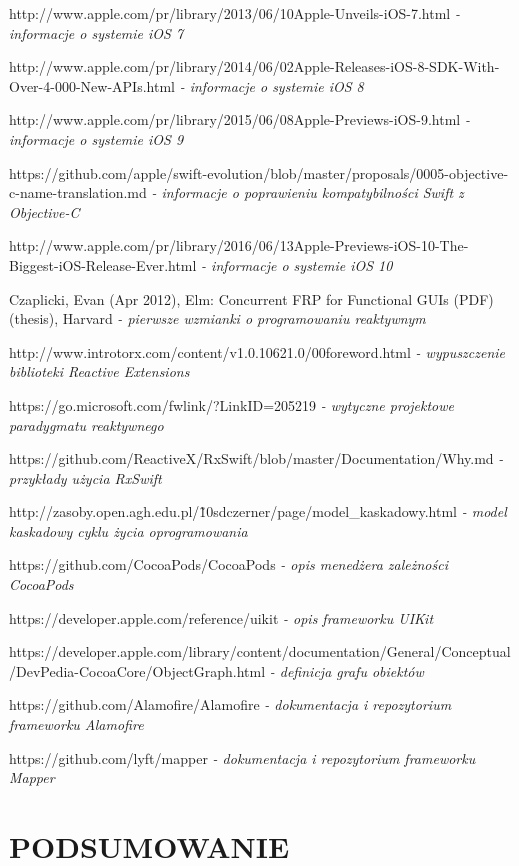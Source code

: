 \documentclass[12pt,oneside,a4paper]{report}
\begin{document}
\begin{thebibliography}{50}
http://www.apple.com/pr/library/2013/06/10Apple-Unveils-iOS-7.html
\emph{ - informacje o systemie iOS 7}

http://www.apple.com/pr/library/2014/06/02Apple-Releases-iOS-8-SDK-With-Over-4-000-New-APIs.html
\emph{ - informacje o systemie iOS 8}

http://www.apple.com/pr/library/2015/06/08Apple-Previews-iOS-9.html
\emph{ - informacje o systemie iOS 9}

https://github.com/apple/swift-evolution/blob/master/proposals/0005-objective-c-name-translation.md
\emph{ - informacje o poprawieniu kompatybilności Swift z Objective-C}

http://www.apple.com/pr/library/2016/06/13Apple-Previews-iOS-10-The-Biggest-iOS-Release-Ever.html
\emph{ - informacje o systemie iOS 10}

 Czaplicki, Evan (Apr 2012), Elm: Concurrent FRP for Functional GUIs (PDF) (thesis), Harvard
\emph{ - pierwsze wzmianki o programowaniu reaktywnym}

 http://www.introtorx.com/content/v1.0.10621.0/00foreword.html
\emph{ - wypuszczenie biblioteki Reactive Extensions}

 https://go.microsoft.com/fwlink/?LinkID=205219
\emph{ - wytyczne projektowe paradygmatu reaktywnego}

https://github.com/ReactiveX/RxSwift/blob/master/Documentation/Why.md
\emph{ - przykłady użycia RxSwift}

 http://zasoby.open.agh.edu.pl/\~10sdczerner/page/model\_kaskadowy.html
\emph{ - model kaskadowy cyklu życia oprogramowania}

 https://github.com/CocoaPods/CocoaPods
\emph{ - opis menedżera zależności CocoaPods}

https://developer.apple.com/reference/uikit
\emph{ - opis frameworku UIKit}

 https://developer.apple.com/library/content/documentation/General/Conceptual/DevPedia-CocoaCore/ObjectGraph.html
\emph{ - definicja grafu obiektów}

https://github.com/Alamofire/Alamofire
\emph{ - dokumentacja i repozytorium frameworku Alamofire}

https://github.com/lyft/mapper
\emph{ - dokumentacja i repozytorium frameworku Mapper}
\end{thebibliography}
\chapter{PODSUMOWANIE}
\end{document}
